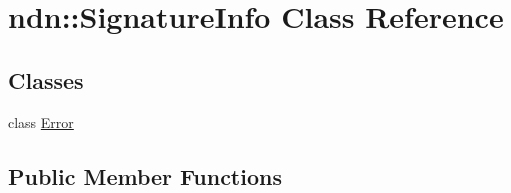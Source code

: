 \hypertarget{classndn_1_1SignatureInfo}{}\section{ndn\+:\+:Signature\+Info Class Reference}
\label{classndn_1_1SignatureInfo}
\subsection*{Classes}
\begin{DoxyCompactItemize}
\item 
class \hyperlink{classndn_1_1SignatureInfo_1_1Error}{Error}
\end{DoxyCompactItemize}
\subsection*{Public Member Functions}
